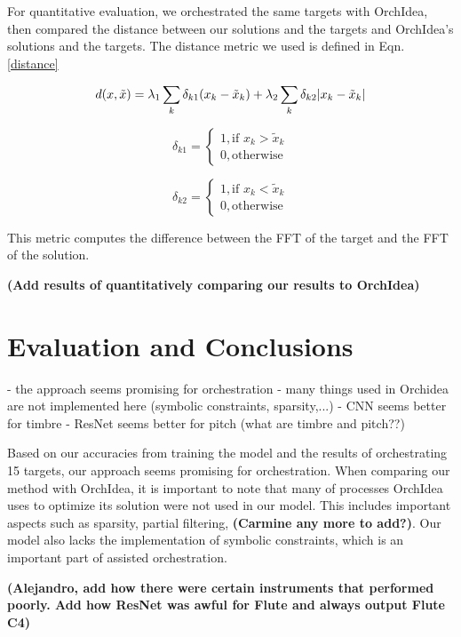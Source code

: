 \documentclass{article}
\begin{document}
For quantitative evaluation, we orchestrated the same targets with OrchIdea, then compared the distance between our solutions and the targets and OrchIdea's solutions and the targets. The distance metric we used is defined in Eqn. \eqref{distance}

\begin{equation}\label{distance}
d(x, \tilde{x}) =\lambda_1 \sum_k \delta_{k1}(x_k - \tilde{x}_k) + \lambda_2 \sum_k \delta_{k2}|x_k - \tilde{x	}_k| \\
\end{equation}

$$
\delta_{k1} = 
\begin{cases}
1, \text{if   } x_k > \tilde{x}_k \\
0, \text{otherwise}
\end{cases} 
$$

$$
\delta_{k2} = 
\begin{cases}
1, \text{if   } x_k < \tilde{x}_k \\
0, \text{otherwise}
\end{cases} 
$$

This metric computes the difference between the FFT of the target and the FFT of the solution. 

\textbf{(Add results of quantitatively comparing our results to OrchIdea)}

\section{Evaluation and Conclusions}
- the approach seems promising for orchestration
- many things used in Orchidea are not implemented here (symbolic constraints, sparsity,...)
- CNN seems better for timbre
- ResNet seems better for pitch (what are timbre and pitch??)

Based on our accuracies from training the model and the results of orchestrating 15 targets, our approach seems promising for orchestration. When comparing our method with OrchIdea, it is important to note that many of processes OrchIdea uses to optimize its solution were not used in our model. This includes important aspects such as sparsity, partial filtering, \textbf{(Carmine any more to add?)}. Our model also lacks the implementation of symbolic constraints, which is an important part of assisted orchestration.

\textbf{(Alejandro, add how there were certain instruments that performed poorly. Add how ResNet was awful for Flute and always output Flute C4)}
\end{document}
